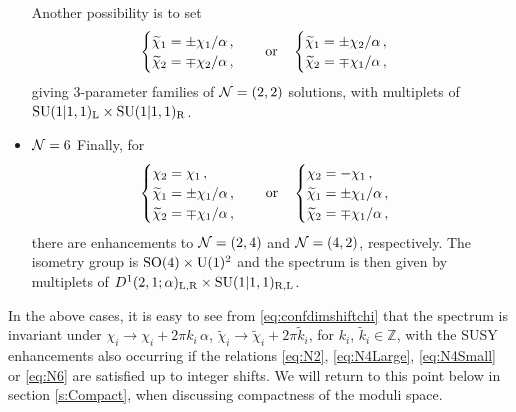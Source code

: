 \documentclass[a4paper, 11pt]{article}
\numberwithin{equation}{section}
\newcommand{\ts}[1]{\widetilde{#1}}
\newcommand{\SU}[1]{\mathrm{SU}( #1 )}
\newcommand{\SO}[1]{\mathrm{SO}( #1 )}
\newcommand{\+}{\oplus}
\begin{document}
\begin{itemize}
	Another possibility is to set
	\begin{equation} \label{eq:N4Small}
		\begin{cases}
			\ts{\chi}_{1} = \pm \chi_{1}/\alpha\,,\\%
			\ts{\chi}_{2} = \mp \chi_{2}/\alpha\,,%
		\end{cases}
		\quad {\rm or}\quad
		\begin{cases}
			\ts{\chi}_{1} = \pm \chi_{2}/\alpha\,,\\%
			\ts{\chi}_{2} = \mp \chi_{1}/\alpha\,,%
		\end{cases}%
	\end{equation}
	giving 3-parameter families of ${\cal N}=(2,2)$ solutions, with multiplets of $\SU{1\vert1,1}_{\rm L}\times\SU{1\vert1,1}_{\rm R}$.
	\item {\boldmath ${\cal N}=6$} Finally, for
	\begin{equation} \label{eq:N6}
		\begin{cases}
			\chi_{2} = \chi_{1}\,,\\%
			\ts{\chi}_{1} = %
			\pm \chi_{1}%
			/\alpha\,,\\
			\ts{\chi}_{2} = %
			\mp \chi_{1}%
			/\alpha\,,
		\end{cases}
		\quad {\rm or}\quad
		\begin{cases}
			\chi_{2} = -\chi_{1}\,,\\%
			\ts{\chi}_{1} = %
			\pm \chi_{1}%
			/\alpha\,,\\
			\ts{\chi}_{2} = %
			\mp \chi_{1}%
			/\alpha\,,
		\end{cases}%
	\end{equation}
	there are enhancements to ${\cal N}=(2,4)$ and ${\cal N}=(4,2)$, respectively. The isometry group is $\SO{4}\times {\rm U}(1)^{2}$ and the spectrum is then given by multiplets of $D^{1}(2,1;\alpha)_{\rm L, R}\times\SU{1\vert1,1}_{\rm R,L}$.
\end{itemize}

In the above cases, it is easy to see from \eqref{eq:confdimshiftchi} that the spectrum  is invariant under $\chi_i \rightarrow \chi_i + 2\pi k_i\,\alpha$, $\ts{\chi}_i \rightarrow \ts{\chi}_i + 2\pi \ts{k}_i$, for $k_i$, $\ts{k}_i \in \mathbb{Z}$, with the SUSY enhancements also occurring if the relations \eqref{eq:N2}, \eqref{eq:N4Large}, \eqref{eq:N4Small} or \eqref{eq:N6} are satisfied up to integer shifts. We will return to this point below in section \ref{s:Compact}, when discussing compactness of the moduli space.
\end{document}
